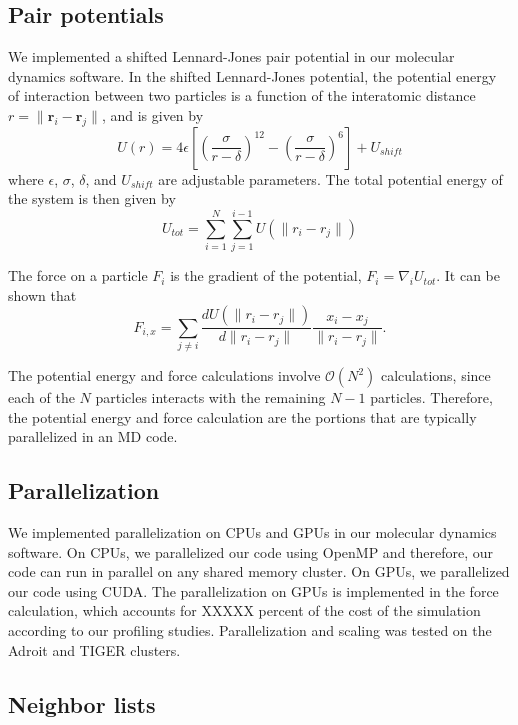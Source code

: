 \documentclass[12pt]{article}
\begin{document}
\subsection{Pair potentials} \label{subsec:potential}

We implemented a shifted Lennard-Jones pair potential in our molecular dynamics software.
%
In the shifted Lennard-Jones potential, the potential energy of interaction between two particles is a function of the interatomic distance $r = \|\mathbf{r}_i - \mathbf{r}_j \|$, and is given by
\begin{equation}
U(r) = 4 \epsilon\left[ \left( \frac{\sigma}{r-\delta} \right)^{12} - \left( \frac{\sigma}{r-\delta} \right)^6 \right] + U_{shift}
\end{equation}
where $\epsilon$, $\sigma$, $\delta$, and $U_{shift}$ are adjustable parameters.
%
The total potential energy of the system is then given by
\begin{equation}
U_{tot} = \sum_{i=1}^{N} \sum_{j=1}^{i-1} U\left( \| r_i - r_j \| \right)
\end{equation}

The force on a particle $F_i$ is the gradient of the potential, $F_i = \nabla_i U_{tot}$.
%
It can be shown that
\begin{equation}
F_{i, x} = \sum_{j \ne i} \frac{d U\left( \| r_i - r_j \| \right)}{d \| r_i - r_j \| } \frac{x_i - x_j}{\|r_i - r_j\|}.
\end{equation}

The potential energy and force calculations involve $\mathcal{O}(N^2)$ calculations, since each of the $N$ particles interacts with the remaining $N-1$ particles.
%
Therefore, the potential energy and force calculation are the portions that are typically parallelized in an MD code.

\subsection{Parallelization}

We implemented parallelization on CPUs and GPUs in our molecular dynamics software.
%
On CPUs, we parallelized our code using OpenMP and therefore, our code can run in parallel on any shared memory cluster.
%
On GPUs, we parallelized our code using CUDA.
The parallelization on GPUs is implemented in the force calculation, which accounts for XXXXX percent of the cost of the simulation according to our profiling studies.
%
Parallelization and scaling was tested on the Adroit and TIGER clusters.
\subsection{Neighbor lists}
\end{document}
